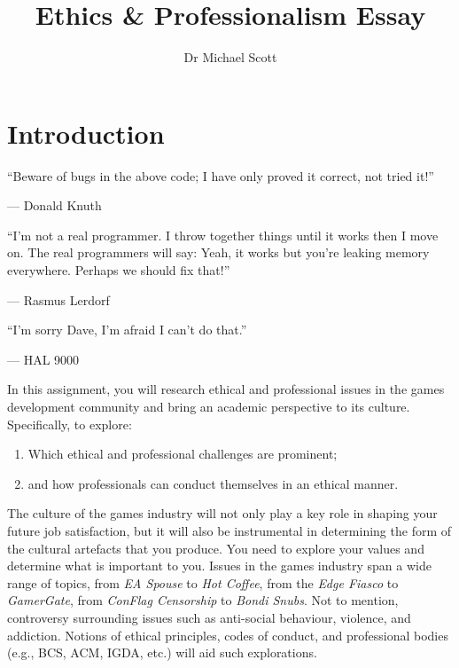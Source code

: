 \documentclass{../fal_assignment}
\title{Ethics \& Professionalism Essay}
\author{Dr Michael Scott}
\begin{document}
\maketitle

\section*{Introduction}

\begin{marginquote}
  ``Beware of bugs in the above code; I have only proved it correct, not tried it!''
  
   --- Donald Knuth
   
    \marginquoterule
    
    ``I'm not a real programmer. I throw together things until it works then I move on. The real programmers will say: Yeah, it works but you're leaking memory everywhere. Perhaps we should fix that!''
    
    --- Rasmus Lerdorf
    
    \marginquoterule
    
    ``I'm sorry Dave, I'm afraid I can't do that.''
    
    --- HAL 9000
      
\end{marginquote}

In this assignment, you will research ethical and professional issues in the games development community and bring an academic perspective to its culture. Specifically, to explore: 

\begin{enumerate}[label=(\roman*)]
    \item Which ethical and professional challenges are prominent;
    \item and how professionals can conduct themselves in an ethical manner.
\end{enumerate}

The culture of the games industry will not only play a key role in shaping your future job satisfaction, but it will also be instrumental in determining the form of the cultural artefacts that you produce. You need to explore your values and determine what is important to you. Issues in the games industry span a wide range of topics, from \textit{EA Spouse} to \textit{Hot Coffee}, from the \textit{Edge Fiasco} to \textit{GamerGate}, from \textit{ConFlag Censorship} to \textit{Bondi Snubs}. Not to mention, controversy surrounding issues such as anti-social behaviour, violence, and addiction. Notions of ethical principles, codes of conduct, and professional bodies (e.g., BCS, ACM, IGDA, etc.) will aid such explorations. 
\end{document}
